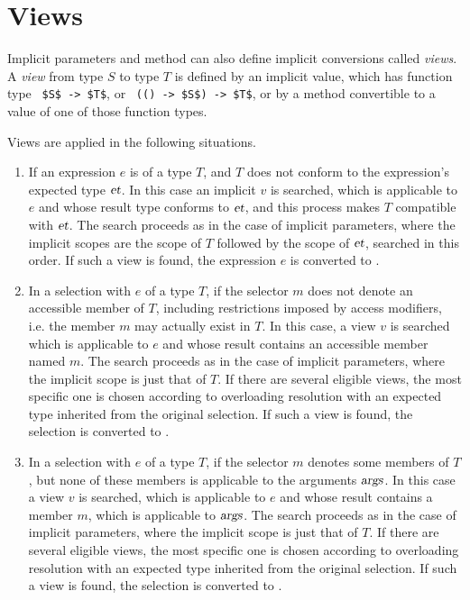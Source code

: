 \section{Views}
\label{sec:views}

Implicit parameters and method can also define implicit conversions called {\em views}. A {\em view} from type $S$ to type $T$ is defined by an implicit value, which has function type ~\lstinline!$S$ -> $T$!, or ~\lstinline!(() -> $S$) -> $T$!, or by a method convertible to a value of one of those function types. 

Views are applied in the following situations.
\begin{enumerate}
\item If an expression $e$ is of a type $T$, and $T$ does not conform to the expression's expected type $\mbox{\sl et}$. In this case an implicit $v$ is searched, which is applicable to $e$ and whose result type conforms to $\mbox{\sl et}$, and this process makes $T$ compatible with $\mbox{\sl et}$. The search proceeds as in the case of implicit parameters, where the implicit scopes are the scope of $T$ followed by the scope of $\mbox{\sl et}$, searched in this order. If such a view is found, the expression $e$ is converted to . 

\item In a selection  with $e$ of a type $T$, if the selector $m$ does not denote an accessible member of $T$, including restrictions imposed by access modifiers, i.e. the member $m$ may actually exist in $T$. In this case, a view $v$ is searched which is applicable to $e$ and whose result contains an accessible member named $m$. The search proceeds as in the case of implicit parameters, where the implicit scope is just that of $T$. If there are several eligible views, the most specific one is chosen according to overloading resolution with an expected type inherited from the original selection. If such a view is found, the selection  is converted to . 

\item In a selection  with $e$ of a type $T$, if the selector $m$ denotes some members of $T$, but none of these members is applicable to the arguments $\mbox{\sl args}$. In this case a view $v$ is searched, which is applicable to $e$ and whose result contains a member $m$, which is applicable to $\mbox{\sl args}$. The search proceeds as in the case of implicit parameters, where the implicit scope is just that of $T$. If there are several eligible views, the most specific one is chosen according to overloading resolution with an expected type inherited from the original selection. If such a view is found, the selection  is converted to . 
\end{enumerate}

